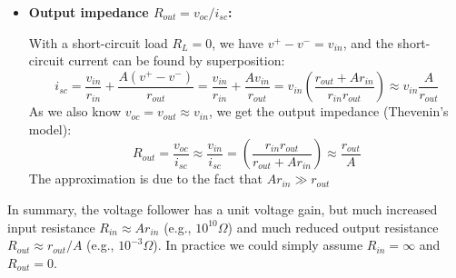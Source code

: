 \documentclass{article}
\begin{document}
\begin{itemize}
\begin{itemize}
  \item {\bf Output impedance $R_{out}=v_{oc}/i_{sc}$:} 

    With a short-circuit load $R_L=0$, we have $v^+-v^-=v_{in}$, and the 
    short-circuit current can be found by superposition:
    \begin{equation}
      i_{sc}=\frac{v_{in}}{r_{in}}+\frac{A(v^+-v^-)}{r_{out}}
      =\frac{v_{in}}{r_{in}}+\frac{Av_{in}}{r_{out}}
      =v_{in}\left(\frac{r_{out}+Ar_{in}}{r_{in}r_{out}}\right)
      \approx v_{in}\frac{A}{r_{out}}
    \end{equation}
    As we also know $v_{oc}=v_{out}\approx v_{in}$, we get the output impedance
    (Thevenin's model):
    \begin{equation}
      R_{out}=\frac{v_{oc}}{i_{sc}}\approx \frac{v_{in}}{i_{sc}}
      =\left(\frac{r_{in}r_{out}}{r_{out}+Ar_{in}}\right)
      \approx \frac{r_{out}}{A}
    \end{equation}
    The approximation is due to the fact that $Ar_{in}\gg r_{out}$
  \end{itemize}

  In summary, the voltage follower has a unit voltage gain, 
  but much increased input resistance $R_{in}\approx A r_{in}$ 
  (e.g., $10^{10}\Omega$) and much reduced output resistance 
  $R_{out}\approx r_{out}/A$ (e.g., $10^{-3} \Omega$).
  In practice we could simply assume $R_{in}=\infty$ and $R_{out}=0$.



  \begin{comment}
    \htmladdimg{../figures/VoltageFollowerModel.png}


\end{comment}
\end{itemize}
\end{document}
